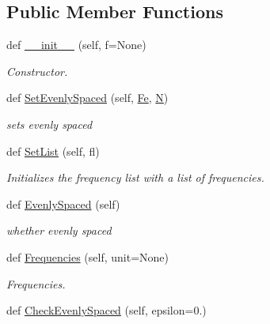 \subsection*{Public Member Functions}
\begin{DoxyCompactItemize}
\item 
def \hyperlink{classSignalIntegrity_1_1FrequencyDomain_1_1FrequencyList_1_1FrequencyList_a8e9ec4f7f7796f2f07894cd60aeecdcd}{\+\_\+\+\_\+init\+\_\+\+\_\+} (self, f=None)
\begin{DoxyCompactList}\small\item\em Constructor. \end{DoxyCompactList}\item 
def \hyperlink{classSignalIntegrity_1_1FrequencyDomain_1_1FrequencyList_1_1FrequencyList_a910c951aef6578c9e467ddef68c94539}{Set\+Evenly\+Spaced} (self, \hyperlink{classSignalIntegrity_1_1FrequencyDomain_1_1FrequencyList_1_1FrequencyList_a7313483ea19e09cf50b8b58d531b871d}{Fe}, \hyperlink{classSignalIntegrity_1_1FrequencyDomain_1_1FrequencyList_1_1FrequencyList_a8cc2e7240164328fdc3f0e5e21032c56}{N})
\begin{DoxyCompactList}\small\item\em sets evenly spaced \end{DoxyCompactList}\item 
def \hyperlink{classSignalIntegrity_1_1FrequencyDomain_1_1FrequencyList_1_1FrequencyList_a23f5bda3ad522bcdc1af831f4178ddca}{Set\+List} (self, fl)
\begin{DoxyCompactList}\small\item\em Initializes the frequency list with a list of frequencies. \end{DoxyCompactList}\item 
def \hyperlink{classSignalIntegrity_1_1FrequencyDomain_1_1FrequencyList_1_1FrequencyList_a3f206c8bc15662bf50b9d889b9870c0d}{Evenly\+Spaced} (self)
\begin{DoxyCompactList}\small\item\em whether evenly spaced \end{DoxyCompactList}\item 
def \hyperlink{classSignalIntegrity_1_1FrequencyDomain_1_1FrequencyList_1_1FrequencyList_a227f355ed05bff8c1061e26a8a53758a}{Frequencies} (self, unit=None)
\begin{DoxyCompactList}\small\item\em Frequencies. \end{DoxyCompactList}\item 
def \hyperlink{classSignalIntegrity_1_1FrequencyDomain_1_1FrequencyList_1_1FrequencyList_a903469a93e04d2e4604e4350f2096a2d}{Check\+Evenly\+Spaced} (self, epsilon=0.)

\end{DoxyCompactItemize}
